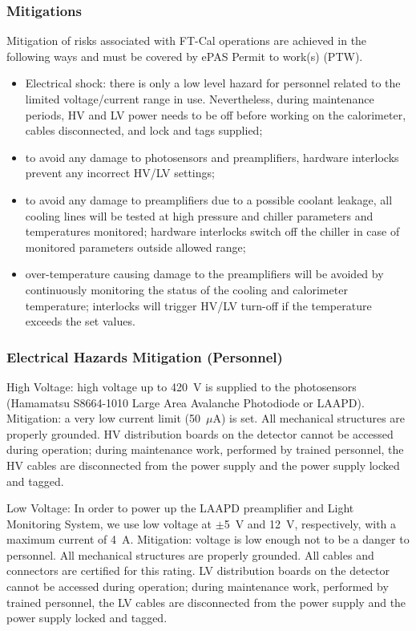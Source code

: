 \subsubsection{Mitigations}

Mitigation of risks associated with FT-Cal operations are achieved in the following ways and
must be covered by ePAS Permit to work(s) (PTW).

\begin{itemize}
\item {Electrical shock: there is only a low level hazard for personnel related to the limited 
voltage/current range in use. Nevertheless, during maintenance periods,  HV and LV  power needs 
to be off before working on the calorimeter, cables disconnected, and lock and tags supplied;}
\item  {to avoid any damage to photosensors and preamplifiers, hardware  interlocks prevent 
any incorrect HV/LV settings; }
\item  {to avoid any damage to preamplifiers due to a possible coolant leakage, all cooling 
lines will be tested at high pressure and chiller parameters and temperatures monitored; 
hardware interlocks switch off the chiller in case of monitored parameters outside 
allowed range; }
\item {over-temperature causing damage to the preamplifiers will be avoided by continuously 
monitoring the status of the cooling and calorimeter temperature; interlocks will trigger HV/LV 
turn-off if the temperature exceeds the set values.}
\end{itemize}

\subsubsection{Electrical Hazards Mitigation (Personnel)}

High Voltage: high voltage up to 420~V is supplied to the photosensors (Hamamatsu S8664-1010 
Large Area Avalanche Photodiode or LAAPD). Mitigation: a very low current limit (50~$\mu$A) is 
set. All mechanical structures are properly grounded. HV distribution boards on the detector 
cannot be accessed during operation; during maintenance work, performed by trained personnel, 
the HV cables are disconnected from the power supply and the power supply locked and tagged.

Low Voltage: In order to power up the LAAPD preamplifier and Light Monitoring System, we use 
low voltage at $\pm$5~V and 12~V, respectively, with a maximum current of 4~A. Mitigation: 
voltage is low enough not to be a danger to personnel. All mechanical structures are properly 
grounded. All cables and connectors are certified for this rating. LV distribution boards on 
the detector cannot be accessed during operation; during maintenance work, performed by trained 
personnel, the LV cables are disconnected from the power supply and the power supply locked and 
tagged.

